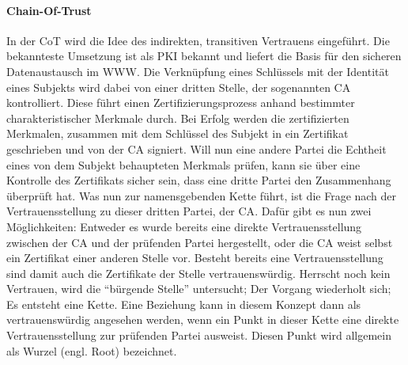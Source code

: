 \paragraph{Chain-Of-Trust}
In der \ac{CoT} wird die Idee des indirekten, transitiven Vertrauens eingeführt. Die bekannteste Umsetzung ist als \ac{PKI} bekannt und liefert die Basis für den sicheren Datenaustausch im \ac{WWW}. Die Verknüpfung eines Schlüssels mit der Identität eines Subjekts wird dabei von einer dritten Stelle, der sogenannten \ac{CA} kontrolliert. Diese führt einen Zertifizierungsprozess  anhand bestimmter charakteristischer Merkmale durch. Bei Erfolg werden die zertifizierten Merkmalen, zusammen mit dem Schlüssel des Subjekt in ein Zertifikat geschrieben und von der \ac{CA} signiert. Will nun eine andere Partei die Echtheit eines von dem Subjekt behaupteten Merkmals prüfen, kann sie über eine Kontrolle des Zertifikats sicher sein, dass eine dritte Partei den Zusammenhang überprüft hat. Was nun zur namensgebenden Kette führt, ist die Frage nach der Vertrauensstellung zu dieser dritten Partei, der \ac{CA}. Dafür gibt es nun zwei Möglichkeiten: Entweder es wurde bereits eine direkte Vertrauensstellung zwischen der \ac{CA} und der prüfenden Partei hergestellt, oder die \ac{CA} weist selbst ein Zertifikat einer anderen Stelle vor. Besteht bereits eine Vertrauensstellung sind damit auch die Zertifikate der Stelle vertrauenswürdig. Herrscht noch kein Vertrauen, wird die ``bürgende Stelle'' untersucht; Der Vorgang wiederholt sich; Es entsteht eine Kette. Eine Beziehung kann in diesem Konzept dann als vertrauenswürdig angesehen werden, wenn ein Punkt in dieser Kette eine direkte Vertrauensstellung zur prüfenden Partei ausweist. Diesen Punkt wird allgemein als Wurzel (engl. Root) bezeichnet\cite[p. 423 ff.]{Eckert2013}.  
